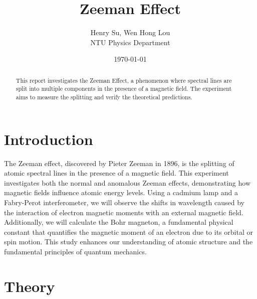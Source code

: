 \documentclass[a4paper,12pt]{article}
\title{Zeeman Effect}
\author{Henry Su, Wen Hong Lou\\ NTU Physics Department}
\date{\today}
\begin{document}
\maketitle

\begin{abstract}
This report investigates the Zeeman Effect, a phenomenon where spectral lines are split into multiple components in the presence of a magnetic field. The experiment aims to measure the splitting and verify the theoretical predictions. 
\end{abstract}

\tableofcontents
\newpage

\section{Introduction}
The Zeeman effect, discovered by Pieter Zeeman in 1896, is the splitting of atomic spectral lines in the presence of a magnetic field. This experiment investigates both the normal and anomalous Zeeman effects, demonstrating how magnetic fields influence atomic energy levels. Using a cadmium lamp and a Fabry-Perot interferometer, we will observe the shifts in wavelength caused by the interaction of electron magnetic moments with an external magnetic field. Additionally, we will calculate the Bohr magneton, a fundamental physical constant that quantifies the magnetic moment of an electron due to its orbital or spin motion. This study enhances our understanding of atomic structure and the fundamental principles of quantum mechanics.
\section{Theory}
\end{document}
